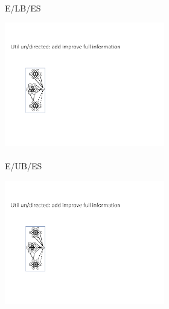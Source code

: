 \begin{figure}[t]
\begin{subfigure}{0.6\textwidth}
\begin{subfigure}{0.15\textwidth}
        \caption{\\E/LB/ES}
        \label{fig:Egal_size_undirected_add_LB}
        \end{subfigure}
        \hfill
        \begin{subfigure}{0.15\textwidth}
            \addtocounter{subfigure}{-1}
            \renewcommand\thesubfigure{\alph{subfigure}3}
            \centering
        \includegraphics[page=25,width=\textwidth]{Graphs/graphs.pdf}
        \caption{\\E/UB/ES}
        \label{fig:Egal_size_undirected_add_UB}
        \end{subfigure}
        \hfill
        \begin{subfigure}{0.15\textwidth}
                    \addtocounter{subfigure}{-1}
            \renewcommand\thesubfigure{\alph{subfigure}4}
            \centering
        \includegraphics[page=33,width=\textwidth]{Graphs/graphs.pdf}

\end{subfigure}
\end{subfigure}
\end{figure}

